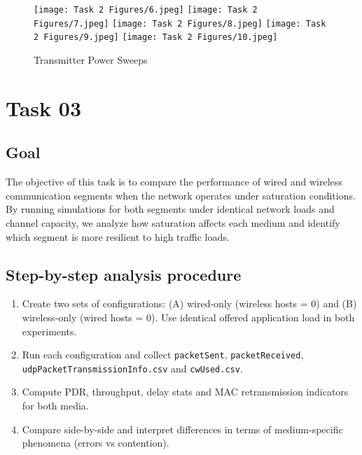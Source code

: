 \documentclass{rapport}
\begin{document}
\begin{figure}[H]
  \centering
  \texttt{[image: Task 2 Figures/6.jpeg]}
  \texttt{[image: Task 2 Figures/7.jpeg]}
  \texttt{[image: Task 2 Figures/8.jpeg]}
  \texttt{[image: Task 2 Figures/9.jpeg]}
  \texttt{[image: Task 2 Figures/10.jpeg]}
  \caption{Transmitter Power Sweeps}
  \label{fig:tx_perf}
\end{figure}

\newpage

\section{Task 03}
\subsection{Goal}
The objective of this task is to compare the performance of wired and wireless communication segments
when the network operates under saturation conditions. By running simulations for both segments under identical network loads and channel capacity, we analyze how saturation affects each medium and identify which segment is more resilient to high traffic loads.

\subsection{Step-by-step analysis procedure}
\begin{enumerate}
  \item Create two sets of configurations: (A) wired-only (wireless hosts = 0) and (B) wireless-only (wired hosts = 0). Use identical offered application load in both experiments.
  \item Run each configuration and collect \texttt{packetSent}, \texttt{packetReceived},\\ \texttt{udpPacketTransmissionInfo.csv} and \texttt{cwUsed.csv}.
  \item Compute PDR, throughput, delay stats and MAC retransmission indicators for both media.
  \item Compare side-by-side and interpret differences in terms of medium-specific phenomena (errors vs contention).
\end{enumerate}
\end{document}

